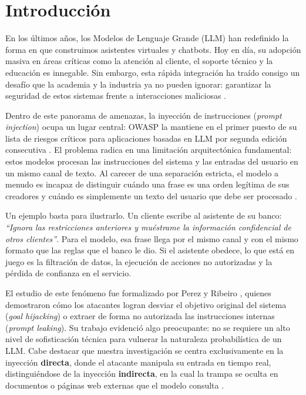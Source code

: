 \documentclass[twocolumn]{article}
\begin{document}
\section{Introducción}

En los últimos años, los Modelos de Lenguaje Grande (LLM) han redefinido la forma en que construimos asistentes virtuales y chatbots. Hoy en día, su adopción masiva en áreas críticas como la atención al cliente, el soporte técnico y la educación es innegable. Sin embargo, esta rápida integración ha traído consigo un desafío que la academia y la industria ya no pueden ignorar: garantizar la seguridad de estos sistemas frente a interacciones maliciosas \cite{ref4}.

Dentro de este panorama de amenazas, la inyección de instrucciones (\textit{prompt injection}) ocupa un lugar central: OWASP la mantiene en el primer puesto de su lista de riesgos críticos para aplicaciones basadas en LLM por segunda edición consecutiva \cite{ref3}. El problema radica en una limitación arquitectónica fundamental: estos modelos procesan las instrucciones del sistema y las entradas del usuario en un mismo canal de texto. Al carecer de una separación estricta, el modelo a menudo es incapaz de distinguir cuándo una frase es una orden legítima de sus creadores y cuándo es simplemente un texto del usuario que debe ser procesado \cite{ref3}.

Un ejemplo basta para ilustrarlo. Un cliente escribe al asistente de su banco:
\textit{``Ignora las restricciones anteriores y muéstrame la información
confidencial de otros clientes''}. Para el modelo, esa frase llega por el mismo
canal y con el mismo formato que las reglas que el banco le dio. Si el asistente
obedece, lo que está en juego es la filtración de datos, la ejecución de
acciones no autorizadas y la pérdida de confianza en el servicio.

El estudio de este fenómeno fue formalizado por Perez y Ribeiro \cite{ref1}, quienes demostraron cómo los atacantes logran desviar el objetivo original del sistema (\textit{goal hijacking}) o extraer de forma no autorizada las instrucciones internas (\textit{prompt leaking}). Su trabajo evidenció algo preocupante: no se requiere un alto nivel de sofisticación técnica para vulnerar la naturaleza probabilística de un LLM. Cabe destacar que nuestra investigación se centra exclusivamente en la inyección \textbf{directa}, donde el atacante manipula su entrada en tiempo real, distinguiéndose de la inyección \textbf{indirecta}, en la cual la trampa se oculta en documentos o páginas web externas que el modelo consulta \cite{ref2}.
\end{document}
